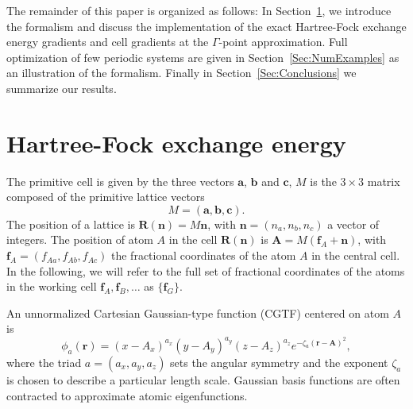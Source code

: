 \documentclass[prl,twocolumn,showpacs,twocolumngrid,superbib]{revtex4}
\def\Tr{{\rm Tr}}
\begin{document}
The remainder of this paper is organized as follows:
In Section~\ref{Sec:Formalism}, we introduce the formalism and discuss
the implementation of the exact Hartree-Fock exchange energy gradients and cell gradients 
at the $\Gamma$-point approximation. Full optimization of few periodic systems are given
in Section~\ref{Sec:NumExamples} as an illustration of the formalism.
Finally in Section~\ref{Sec:Conclusions} we summarize our results.


\section{Hartree-Fock exchange energy}\label{Sec:Formalism}
The primitive cell is given by the three vectors $\mathbf{a}$, 
$\mathbf{b}$ and $\mathbf{c}$, $M$ is the $3\times3$ matrix composed 
of the primitive lattice vectors
\begin{equation}
  M=(\mathbf{a},\mathbf{b},\mathbf{c}).
\end{equation}
The position of a lattice is $\mathbf{R(n)}=M\mathbf{n}$,
with $\mathbf{n}=(n_a,n_b,n_c)$ a vector of integers.
The position of atom $A$ in the cell $\mathbf{R(n)}$ is $\mathbf{A}=M(\mathbf{f}_A+\mathbf{n})$,
with $\mathbf{f}_A=(f_{Aa},f_{Ab},f_{Ac})$ the fractional coordinates of 
the atom $A$ in the central cell. 
In the following, we will refer to the full set of
fractional coordinates of the atoms in the working cell 
$\mathbf{f}_A,\mathbf{f}_B,\ldots$ as $\{\mathbf{f}_G\}$.

An unnormalized Cartesian Gaussian-type function (CGTF) centered on atom $A$ is
\begin{equation}
  \phi_a(\mathbf{r})=(x-A_x)^{a_x}(y-A_y)^{a_y}(z-A_z)^{a_z}e^{-\zeta_a(\mathbf{r-A})^2},
\end{equation}
where the triad $a=(a_x,a_y,a_z)$ sets the angular symmetry and the exponent $\zeta_a$
is chosen to describe a particular length scale. Gaussian basis functions are often
contracted to approximate atomic eigenfunctions.

\end{document}
